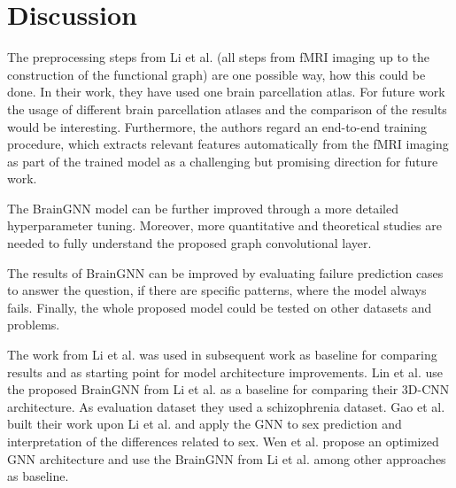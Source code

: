 \section{Discussion} \label{analysis}

The preprocessing steps from Li et al. \cite{LI2021102233} (all steps from fMRI imaging up to the construction of the functional graph) are one possible way, how this could be done. 
In their work, they have used one brain parcellation atlas. For future work the usage of different brain parcellation atlases and the comparison of the results would be interesting. Furthermore, the authors regard an end-to-end training procedure, which extracts relevant features automatically from the fMRI imaging as part of the trained model as a challenging but promising direction for future work.

The BrainGNN model can be further improved through a more detailed hyperparameter tuning. Moreover, more quantitative and theoretical studies are needed to fully understand the proposed graph convolutional layer.

The results of BrainGNN can be improved by evaluating failure prediction cases to answer the question, if there are specific patterns, where the model always fails. 
Finally, the whole proposed model could be tested on other datasets and problems.

The work from Li et al. \cite{LI2021102233} was used in subsequent work as baseline for comparing results and as starting point for model architecture improvements.
Lin et al. \cite{LIN2022102430} use the proposed BrainGNN from Li et al. \cite{LI2021102233} as a baseline for comparing their 3D-CNN architecture. As evaluation dataset they used a schizophrenia dataset. 
Gao et al. \cite{gaoSexDifferencesCerebellum2022} built their work upon Li et al. \cite{LI2021102233} and apply the GNN to sex prediction and interpretation of the differences related to sex.
Wen et al. \cite{WEN2022105239} propose an optimized GNN architecture and use the BrainGNN from Li et al. \cite{LI2021102233} among other approaches as baseline. 
